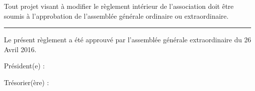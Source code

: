 \documentclass[a4paper, 11pt]{article}
\newcommand\sep{\noindent\rule{\linewidth}{.5pt}}
\begin{document}
Tout projet visant à modifier le règlement intérieur de l'association doit être soumis à l'approbation de l'assemblée
générale ordinaire ou extraordinaire.

\bigskip\bigskip

\sep

\bigskip\bigskip

Le présent règlement a été approuvé par l'assemblée générale extraordinaire du 26 Avril 2016.

\bigskip\bigskip

Président(e) :


\bigskip\bigskip

Trésorier(ère) :
\end{document}

